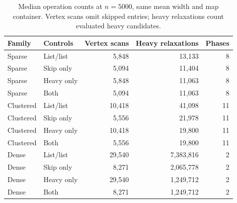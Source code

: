 \begin{table}[tb]\centering\small\setlength{\tabcolsep}{3.5pt}
\caption{Median operation counts at $n=5000$, same mean width and map container. Vertex scans omit skipped entries; heavy relaxations count evaluated heavy candidates.}
\begin{tabular}{llrrr}
\toprule
Family & Controls & Vertex scans & Heavy relaxations & Phases \\ \midrule
Sparse & List/list & 5,848 & 13,133 & 8 \\
Sparse & Skip only & 5,094 & 11,404 & 8 \\
Sparse & Heavy only & 5,848 & 11,063 & 8 \\
Sparse & Both & 5,094 & 11,063 & 8 \\
Clustered & List/list & 10,418 & 41,098 & 11 \\
Clustered & Skip only & 5,556 & 21,978 & 11 \\
Clustered & Heavy only & 10,418 & 19,800 & 11 \\
Clustered & Both & 5,556 & 19,800 & 11 \\
Dense & List/list & 29,540 & 7,383,816 & 2 \\
Dense & Skip only & 8,271 & 2,065,778 & 2 \\
Dense & Heavy only & 29,540 & 1,249,712 & 2 \\
Dense & Both & 8,271 & 1,249,712 & 2 \\
\bottomrule\end{tabular}\end{table}
